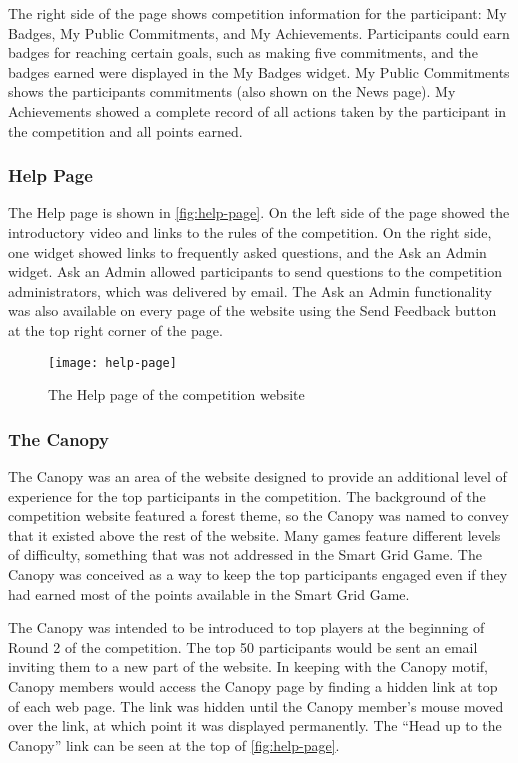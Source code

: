 The right side of the page shows competition information for the participant: My Badges, My Public Commitments, and My Achievements. Participants could earn badges for reaching certain goals, such as making five commitments, and the badges earned were displayed in the My Badges widget. My Public Commitments shows the participants commitments (also shown on the News page). My Achievements showed a complete record of all actions taken by the participant in the competition and all points earned.


\subsubsection{Help Page}

The Help page is shown in \autoref{fig:help-page}. On the left side of the page showed the introductory video and links to the rules of the competition. On the right side, one widget showed links to frequently asked questions, and the Ask an Admin widget. Ask an Admin allowed participants to send questions to the competition administrators, which was delivered by email. The Ask an Admin functionality was also available on every page of the website using the Send Feedback button at the top right corner of the page.

\begin{figure}[htbp]
	\centering
		\texttt{[image: help-page]}
		\caption{The Help page of the competition website}
\label{fig:help-page}
\end{figure}


\subsubsection{The Canopy}

The Canopy was an area of the website designed to provide an additional level of experience for the top participants in the competition. The background of the competition website featured a forest theme, so the Canopy was named to convey that it existed above the rest of the website. Many games feature different levels of difficulty, something that was not addressed in the Smart Grid Game. The Canopy was conceived as a way to keep the top participants engaged even if they had earned most of the points available in the Smart Grid Game.

The Canopy was intended to be introduced to top players at the beginning of Round 2 of the competition. The top 50 participants would be sent an email inviting them to a new part of the website. In keeping with the Canopy motif, Canopy members would access the Canopy page by finding a hidden link at top of each web page. The link was hidden until the Canopy member's mouse moved over the link, at which point it was displayed permanently. The ``Head up to the Canopy'' link can be seen at the top of \autoref{fig:help-page}.

